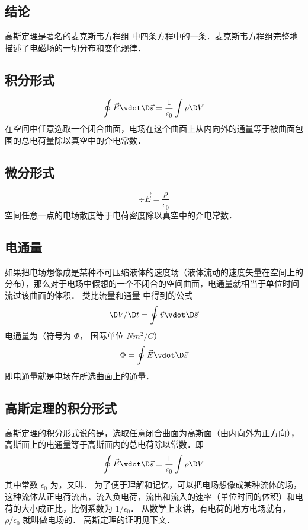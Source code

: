 
\subsection{结论}

高斯定理是著名的麦克斯韦方程组%
中四条方程中的一条．麦克斯韦方程组完整地描述了电磁场的一切分布和变化规律．

\subsection{积分形式}    
\begin{equation}
\oint {\vec E \vdot \D \vec s}  = \frac{1}{{{\epsilon _0}}}\int {\rho \D V} 
\end{equation}               
在空间中任意选取一个闭合曲面，电场在这个曲面上从内向外的通量等于被曲面包围的总电荷量除以真空中的介电常数．

\subsection{微分形式} 
\begin{equation}
\div \vec E = \frac{\rho }{{{\epsilon _0}}}
\end{equation}                      
空间任意一点的电场散度等于电荷密度除以真空中的介电常数．


\subsection{电通量}

如果把电场想像成是某种不可压缩液体的速度场（液体流动的速度矢量在空间上的分布），那么对于电场中假想的一个不闭合的空间曲面，电通量就相当于单位时间流过该曲面的体积．
类比流量和通量%
中得到的公式
\begin{equation}
\D V/\D t = \oint {\vec v \vdot \D \vec s} 
\end{equation} 
电通量为（符号为 $\Phi $， 国际单位 $N{m^2}/C$）
\begin{equation}
\Phi  = \oint {\vec E \vdot \D \vec s} 
\end{equation} 
即电通量就是电场在所选曲面上的通量．


\subsection{高斯定理的积分形式}

高斯定理的积分形式说的是，选取任意闭合曲面为高斯面（由内向外为正方向），高斯面上的电通量等于高斯面内的总电荷除以常数．即
\begin{equation}
\oint {\vec E \vdot \D \vec s}  = \frac{1}{{{\epsilon _0}}}\int {\rho  \D V} 
\end{equation} 
其中常数 ${\epsilon _0}$ 为，又叫．
为了便于理解和记忆，可以把电场想像成某种流体的场，这种流体从正电荷流出，流入负电荷，流出和流入的速率（单位时间的体积）和电荷的大小成正比，比例系数为 $1/{\epsilon _0}$． 从数学上来讲，有电荷的地方电场就有， $\rho /{\epsilon _0}$ 就叫做电场的． 高斯定理的证明见下文．


